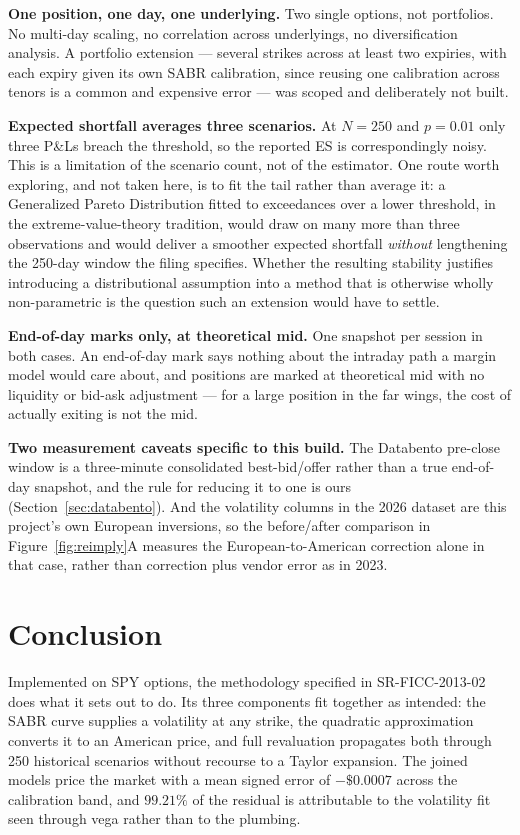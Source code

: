 \documentclass[11pt]{article}
\begin{document}
\textbf{One position, one day, one underlying.} Two single options, not portfolios. No
multi-day scaling, no correlation across underlyings, no diversification analysis. A
portfolio extension --- several strikes across at least two expiries, with each expiry
given its own SABR calibration, since reusing one calibration across tenors is a
common and expensive error --- was scoped and deliberately not built.

\textbf{Expected shortfall averages three scenarios.} At $N=250$ and $p=0.01$ only three
P\&Ls breach the threshold, so the reported ES is correspondingly noisy. This is a
limitation of the scenario count, not of the estimator. One route worth exploring, and
not taken here, is to fit the tail rather than average it: a Generalized Pareto
Distribution fitted to exceedances over a lower threshold, in the extreme-value-theory
tradition, would draw on many more than three observations and would deliver a smoother
expected shortfall \emph{without} lengthening the 250-day window the filing specifies.
Whether the resulting stability justifies introducing a distributional assumption into a
method that is otherwise wholly non-parametric is the question such an extension would
have to settle.

\textbf{End-of-day marks only, at theoretical mid.} One snapshot per session in both
cases. An end-of-day mark says nothing about the intraday path a margin model would care
about, and positions are marked at theoretical mid with no liquidity or bid-ask
adjustment --- for a large position in the far wings, the cost of actually exiting is not
the mid.

\textbf{Two measurement caveats specific to this build.} The Databento pre-close window
is a three-minute consolidated best-bid/offer rather than a true end-of-day snapshot, and
the rule for reducing it to one is ours (Section~\ref{sec:databento}). And the
volatility columns in the 2026 dataset are this project's own European inversions, so the
before/after comparison in Figure~\ref{fig:reimply}A measures the
European-to-American correction alone in that case, rather than correction plus vendor
error as in 2023.

\section{Conclusion}

Implemented on SPY options, the methodology specified in SR-FICC-2013-02 does what it
sets out to do. Its three
components fit together as intended: the SABR curve supplies a volatility at any strike,
the quadratic approximation converts it to an American price, and full revaluation
propagates both through 250 historical scenarios without recourse to a Taylor expansion.
The joined models price the market with a mean signed error of $-\$0.0007$ across the
calibration band, and $99.21\%$ of the residual is attributable to the volatility fit
seen through vega rather than to the plumbing.
\end{document}
